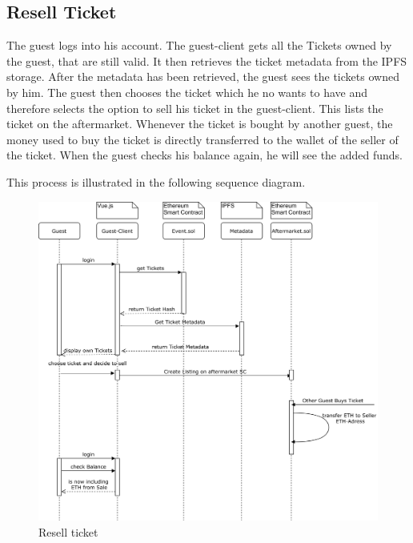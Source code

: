 \subsection{Resell Ticket}
The guest logs into his account. The guest-client gets all the Tickets owned by the guest, that are still valid. It then retrieves the ticket metadata from the IPFS storage. After the metadata has been retrieved, the guest sees the tickets owned by him. The guest then chooses the ticket which he no wants to have and therefore selects the option to sell his ticket in the guest-client. This lists the ticket on the aftermarket. Whenever the ticket is bought by another guest, the money used to buy the ticket is directly transferred to the wallet of the seller of the ticket. When the guest checks his balance again, he will see the added funds.

This process is illustrated in the following sequence diagram.

\begin{figure}[H]
    \centering
    \includegraphics[width=16cm]{design/diagrams/Resell Ticket.png}
    \caption{Resell ticket}
    \label{fig:Resell-ticket}
\end{figure}

